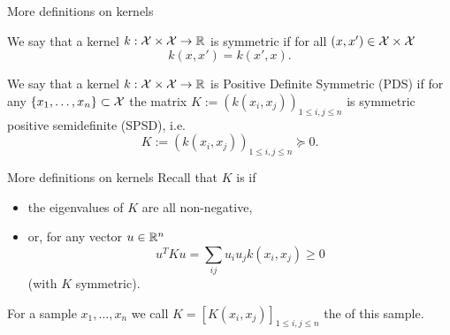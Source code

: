 \documentclass[xcolor={usenames,dvipsnames}]{beamer}
\begin{document}
%
%
%
%
%


\begin{frame}{More definitions on kernels}

\begin{definition}[Symmetry]
We say that a kernel $k :{\mathcal{X}} \times{\mathcal{X}} \to \mathbb{R}$ is symmetric if for all $(x,x') \in {\mathcal{X}} \times {\mathcal{X}}$
$$
k(x,x') = k(x',x).
$$
\end{definition}
\pause 
\begin{definition}
We say that a kernel $k :{\mathcal{X}} \times{\mathcal{X}} \to \mathbb{R}$ is Positive Definite Symmetric (PDS) if for any $\{x_1,\hdots , x_n \}\subset {\mathcal{X}}$ the matrix $K := \left( k(x_i,x_j) \right)_{1\leq i,j \leq n}$ is symmetric positive semidefinite (SPSD), i.e.\
$$
K := \left( k(x_i,x_j) \right)_{1\leq i,j \leq n} \succeq 0.
$$ 
\end{definition}
\end{frame}

\begin{frame}{More definitions on kernels}
Recall that $K$ is  if
\begin{itemize}
\item the eigenvalues of $K$ are all non-negative,
\item or, for any vector $u\in \mathbb{R}^n$
$$
u^T K u = \sum_{ij} u_i u_j k(x_i,x_j) \geq 0
$$
(with $K$ symmetric).
\end{itemize}

\medskip 

For a sample $x_1, \ldots, x_n$ we call $K = 
   [K(x_i, x_j)]_{1 \leq i, j \leq n}$ the  of this sample.
\end{frame}
\end{document}
